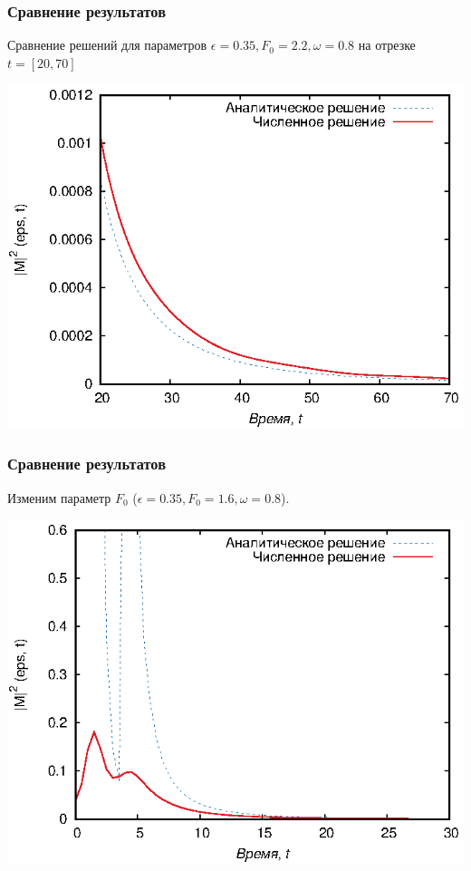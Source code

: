 \documentclass{beamer}
\begin{document}
\frame
{
	\frametitle{Сравнение результатов}
	Сравнение решений для параметров $\epsilon = 0.35, F_0 = 2.2, \omega = 0.8$ на отрезке $t = [20,70]$
	
	\begin{center}
		\includegraphics{end2}  
	\end{center}	
}

\frame
{
	\frametitle{Сравнение результатов}
	Изменим параметр $F_0$ ($\epsilon = 0.35, F_0 = 1.6, \omega = 0.8$).
	
	\begin{center}
		\includegraphics{full3}  
	\end{center}	
}
\end{document}
